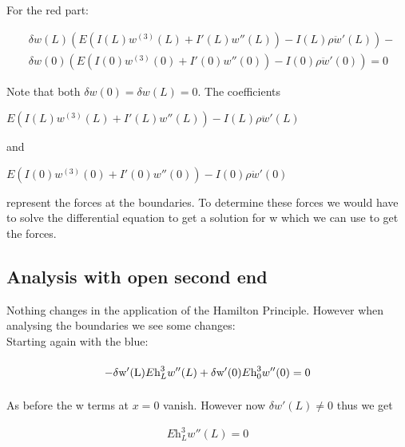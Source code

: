 For the red part:

\begin{equation}
    \begin{split}
        &\delta w(L) \left(E\left(I(L)w^{(3)}(L) + I'(L)w''(L)\right) - I(L)\rho \ddot w'(L)\right) - \\
        &\delta w(0) \left(E\left(I(0)w^{(3)}(0) + I'(0)w''(0)\right) - I(0)\rho \ddot w'(0)\right) = 0
    \end{split}
\end{equation}

Note that both $\delta w(0) = \delta w(L) = 0$. The coefficients
\begin{center}
    $E\left(I(L)w^{(3)}(L) + I'(L)w''(L)\right) - I(L)\rho \ddot w'(L)$
\end{center}
 
and 

\begin{center}
    $E\left(I(0)w^{(3)}(0) + I'(0)w''(0)\right) - I(0)\rho \ddot w'(0)$
\end{center}

represent the forces at the boundaries. To determine these forces we would have to solve the differential equation to get a solution for w which we can use to get the forces.

\subsection{Analysis with open second end}

Nothing changes in the application of the Hamilton Principle. However when analysing the boundaries we see some changes:\\
\vspace{5mm}
\noindent Starting again with the blue:

\begin{equation}
    \begin{split}
        -\mathrm{\delta w'(L)}E\text{h}_L^3w''(L) + \mathrm{\delta w'(0)}\vphantom{\int}E\text{h}_0^3w''(0) = 0
    \end{split}
\end{equation}

As before the w terms at $x = 0$ vanish. However now $\delta w'(L) \neq 0$ thus we get 

\begin{equation}
    \begin{split}
        E\text{h}_L^3w''(L) = 0
    \end{split}
\end{equation}

